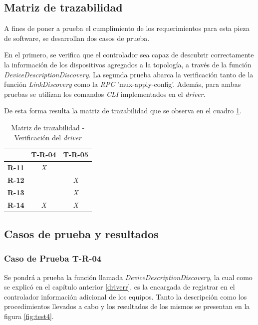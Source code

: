 \subsection{Matriz de trazabilidad}

A fines de poner a prueba el cumplimiento de los requerimientos para esta pieza de software, se desarrollan dos casos de prueba. 

En el primero, se verifica que el controlador sea capaz de descubrir correctamente la información de los dispositivos agregados a la topología, a través de la función \textit{DeviceDescriptionDiscovery}. La segunda prueba abarca la verificación tanto de la función \textit{LinkDiscovery} como la  \textit{RPC} 'mux-apply-config'. Además, para ambas pruebas se utilizan los comandos \textit{CLI} implementados en el \textit{driver}.

De esta forma resulta la matriz de trazabilidad que se observa en el cuadro \ref{tab:matriz_driver}.


\begin{table}[!h]
    \centering
    \begin{tabular}{|c|c|c|}
        \hline
        \textbf{}     & \textbf{T-R-04} & \textbf{T-R-05} \\ \hline
        \textbf{R-11} & \textit{X}      & \textit{}       \\ \hline
        \textbf{R-12} & \textit{}       & \textit{X}      \\ \hline
        \textbf{R-13} & \textit{}       & \textit{X}      \\ \hline
        \textbf{R-14} & \textit{X}      & \textit{X}      \\ \hline
        \end{tabular}
    \caption{Matriz de trazabilidad - Verificación del \textit{driver}}
    \label{tab:matriz_driver}
\end{table}

\subsection{Casos de prueba y resultados}

\subsubsection{Caso de Prueba T-R-04}

Se pondrá a prueba la función llamada \textit{DeviceDescriptionDiscovery}, la cual como se explicó en el capítulo anterior \ref{driverr}, es la encargada de registrar en el controlador información adicional de los equipos. Tanto la descripción como los procedimientos llevados a cabo y los resultados de los mismos se presentan en la figura \ref{fig:test4}. 

